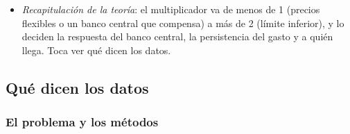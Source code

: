 \documentclass[11pt]{article}
\begin{document}
\begin{itemize}
\item \emph{Recapitulación de la teoría}: el multiplicador va de menos de 1 (precios flexibles o un banco central que compensa) a más de 2 (límite inferior), y lo deciden la respuesta del banco central, la persistencia del gasto y a quién llega. Toca ver qué dicen los datos.
\end{itemize}

\subsection{Qué dicen los datos}\label{sec:evidencia-multiplicador}

\subsubsection{El problema y los métodos}\label{sec:metodos}
\end{document}
